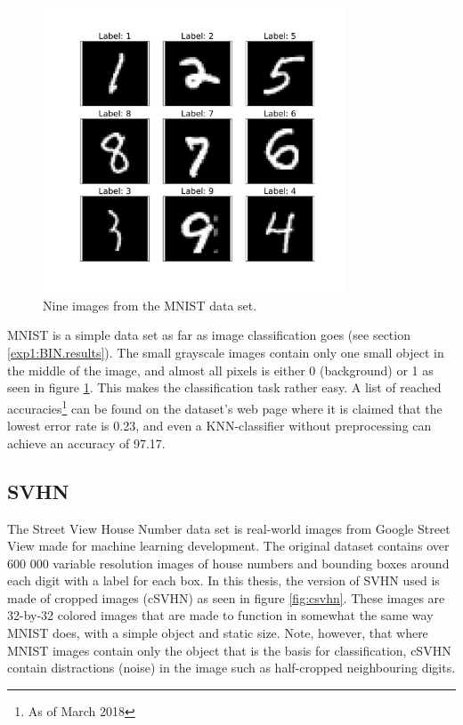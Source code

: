 \begin{figure}[p!]
    \centering
    \includegraphics[width=0.8\textwidth]{Chapters/3.Implementation/figures/MNIST.pdf}
    \caption[MNIST example]{Nine images from the MNIST data set.}
    \label{fig:mnist}
\end{figure}

MNIST is a simple data set as far as image classification goes (see section \ref{exp1:BIN.results}). The small grayscale images contain only one small object in the middle of the image, and almost all pixels is either 0 (background) or 1 as seen in figure \ref{fig:mnist}. This makes the classification task rather easy. A list of reached accuracies\footnote{As of March 2018} can be found on the dataset's web page where it is claimed that the lowest error rate is 0.23\cite{goodmnist}, and even a KNN-classifier without preprocessing can achieve an accuracy of 97.17. 


\subsection{SVHN}\label{Implementation:SVHN}
The Street View House Number\cite{SVHN} data set is real-world images from Google Street View made for machine learning development. The original dataset contains over 600 000 variable resolution images of house numbers and bounding boxes around each digit with a label for each box. In this thesis, the version of SVHN used is made of cropped images (cSVHN) as seen in figure \ref{fig:csvhn}. These images are 32-by-32 colored images that are made to function in somewhat the same way MNIST does, with a simple object and static size. Note, however, that where MNIST images contain only the object that is the basis for classification, cSVHN contain distractions (noise) in the image such as half-cropped neighbouring digits. 

